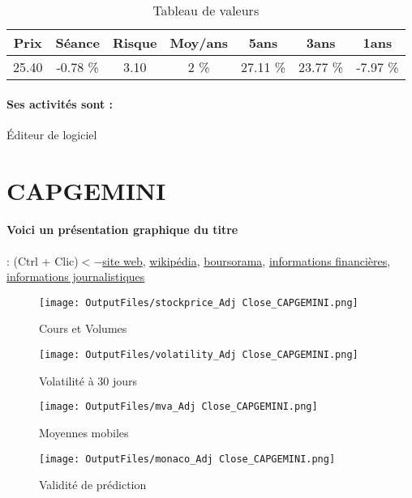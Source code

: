 \documentclass[11pt,a4paper]{report}%
\begin{document}
\begin{table}[H]
  \centering
    \begin{tabular}{|c|c|c|c|c|c|c|}
    \hline
    Prix & Séance & Risque  & Moy/ans & 5ans & 3ans & 1ans \\
    \hline
    25.40 &    -0.78 \%    & 3.10 & 2 \% & 27.11 \% & 23.77 \% & -7.97 \% \\
    \hline
    \end{tabular}%
        \label{tab:table_AXWAY SOFTWARE}%
      \caption{Tableau de valeurs}
\end{table}%

\paragraph{Ses activités sont : } Éditeur de logiciel 
    
    \newpage

\section{CAPGEMINI}

\paragraph{Voici un présentation graphique du titre} : (Ctrl + Clic)$<-$\href{https://investors.capgemini.com/fr/}{site web}, \href{https://fr.wikipedia.org/wiki/Capgemini}{wikipédia}, \href{https://www.boursorama.com/cours/1rPCAP}{boursorama}, \href{https://www.qwant.com/?q=site:https:%2f%2fwww.easybourse.com%2faction-societe%2fCAPGEMINI&t=web&client=ext-firefox-hp}{informations financières}, \href{https://bourse.lerevenu.com/cours-de-bourse/fiche-valeur-synthese/CAPGEMINI/CAP-FR}{informations journalistiques}
\begin{figure}[!htb]
   \begin{minipage}{0.5\textwidth}
     \centering
     \texttt{[image: OutputFiles/stockprice\_Adj Close\_CAPGEMINI.png]}
     \caption{Cours et Volumes}\label{Fig:price_CAPGEMINI}
   \end{minipage}\hfill
   \begin{minipage}{0.5\textwidth}
     \centering
     \texttt{[image: OutputFiles/volatility\_Adj Close\_CAPGEMINI.png]}
     \caption{Volatilité à 30 jours}\label{Fig:volat_CAPGEMINI}
   \end{minipage}
\end{figure}
\begin{figure}[!htb]
   \begin{minipage}{0.5\textwidth}
     \centering
     \texttt{[image: OutputFiles/mva\_Adj Close\_CAPGEMINI.png]}
     \caption{Moyennes mobiles}\label{Fig:mva_CAPGEMINI}
   \end{minipage}\hfill
   \begin{minipage}{0.5\textwidth}
     \centering
     \texttt{[image: OutputFiles/monaco\_Adj Close\_CAPGEMINI.png]}
     \caption{Validité de prédiction}\label{Fig:prediction_CAPGEMINI}
   \end{minipage}
\end{figure}
\end{document}
